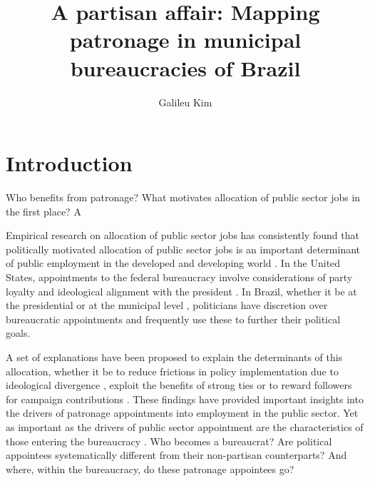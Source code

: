 \documentclass[12pt,a4paper]{article}
\title{A partisan affair: Mapping patronage in municipal bureaucracies of Brazil}
\author{Galileu Kim}
\affil{Princeton University}
\begin{document}
\maketitle


\newpage

\section{Introduction}
\label{sec:intro}

Who benefits from patronage? What motivates allocation of public sector jobs in the first place? A

Empirical research on allocation of public sector jobs has consistently found that politically motivated allocation of public sector jobs is an important determinant of public employment in the developed and developing world \citep{finan2017personnel}. In the United States, appointments to the federal bureaucracy involve considerations of party loyalty and ideological alignment with the president \citep{lewis2010politics, hollibaugh2014presidents}. In Brazil, whether it be at the presidential \citep{pracca2011political} or at the municipal level \citep{colonnelli2018patronage,brollo2017victor}, politicians have discretion over bureaucratic appointments and frequently use these to further their political goals.

A set of explanations have been proposed to explain the determinants of this allocation, whether it be to reduce frictions in policy implementation due to ideological divergence \citep{krause2016experiential}, exploit the benefits of strong ties \citep{toral2019benefits} or to reward followers for campaign contributions \citep{colonnelli2018patronage}. These findings have provided important insights into the drivers of patronage appointments into employment in the public sector. Yet as important as the drivers of public sector appointment are the characteristics of those entering the bureaucracy \citep{finan2015personnel}. Who becomes a bureaucrat? Are political appointees systematically different from their non-partisan counterparts? And where, within the bureaucracy, do these patronage appointees go?
\end{document}
